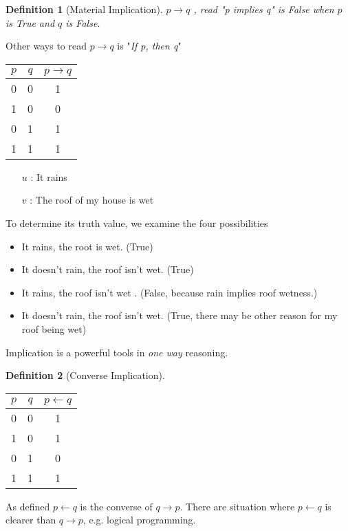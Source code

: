 \documentclass[10pt,a4paper,draft,titlepage,onecolumn]{book}
\newtheorem{definition}{Definition}[section]
\begin{document}

\begin{definition}[Material Implication] $p \rightarrow q$ , read \textit{"p implies q"} is False when $p$ is True and $q$ is False.  
\end{definition} 
Other ways to read $p \rightarrow q$  is  "\textit{If p, then q}"

\begin{center}
\begin{tabular}{ |c|c|c| }
 \hline
 $p$ & $q$ &  $p \rightarrow q$  \\
 \hline
 0 & 0 & 1 \\
 1 & 0 & 0 \\
 0 & 1 & 1 \\
 1 & 1 & 1 \\
 \hline
\end{tabular}
\end{center}


\begin{itemize}
\item[$u$]: It rains
\item[$v$]: The roof of my house is wet
\end{itemize}
To determine its truth value, we examine the four possibilities
\begin{itemize}
\item It rains, the root is wet. (True)
\item It doesn't rain, the roof isn't wet. (True)
\item It rains, the roof isn't wet . (False, because rain implies roof wetness.)
\item It doesn't rain, the roof isn't wet. (True, there may be other reason for my roof being wet)
\end{itemize}
Implication is a powerful tools in \textit{one way} reasoning. 

\begin{definition}[Converse Implication]
\end{definition}

\begin{tabular}{ |c|c|c| }
 \hline
 $p$ & $q$ &  $p{\leftarrow}q$  \\
 \hline
 0 & 0 & 1 \\
 1 & 0 & 1\\
 0 & 1 & 0\\
 1 & 1 & 1\\
 \hline
\end{tabular}
As defined $p{\leftarrow}q$ is the converse of $q{\rightarrow}p$.
There are situation where $p{\leftarrow}q$ is clearer than $q{\rightarrow}p$, e.g. logical programming.
\end{document}
